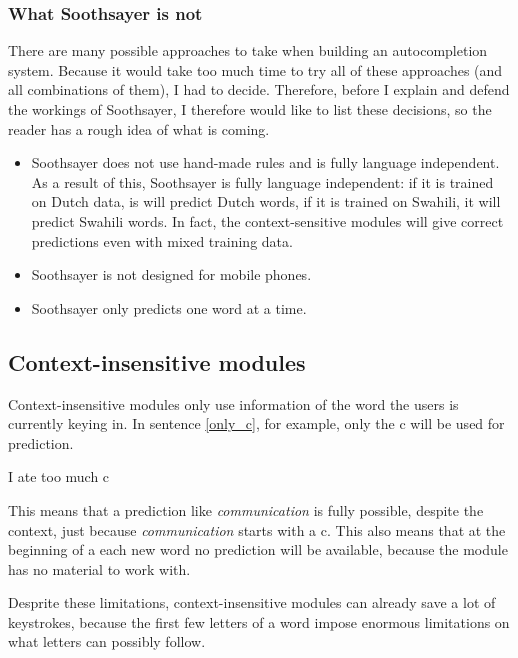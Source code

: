 \documentclass[12pt]{article}
\begin{document}

\subsubsection{What Soothsayer is not}
There are many possible approaches to take when building an autocompletion system. Because it would take too much time to try all of these approaches (and all combinations of them), I had to decide. Therefore, before I explain and defend the workings of Soothsayer, I therefore would like to list these decisions, so the reader has a rough idea of what is coming. 

\begin{itemize}
\item Soothsayer does not use hand-made rules and is fully language independent.
As a result of this, Soothsayer is fully language independent: if it is trained on Dutch data, is will predict Dutch words, if it is trained on Swahili, it will predict Swahili words. In fact, the context-sensitive modules will give correct predictions even with mixed training data.
\item Soothsayer is not designed for mobile phones.

\item Soothsayer only predicts one word at a time.
\end{itemize}


\subsection{Context-insensitive modules} \label{ci}

Context-insensitive modules only use information of the word the users is currently keying in. In sentence \ref{only_c}, for example, only the c will be used for prediction. 

\begin{examples}
\item I ate too much c \label{only_c}
\end{examples}

This means that a prediction like \emph{communication} is fully possible, despite the context, just because \emph{communication} starts with a c. This also means that at the beginning of a each new word no prediction will be available, because the module has no material to work with.

Desprite these limitations, context-insensitive modules can already save a lot of keystrokes, because the first few letters of a word impose enormous limitations on what letters can possibly follow.
\end{document}
